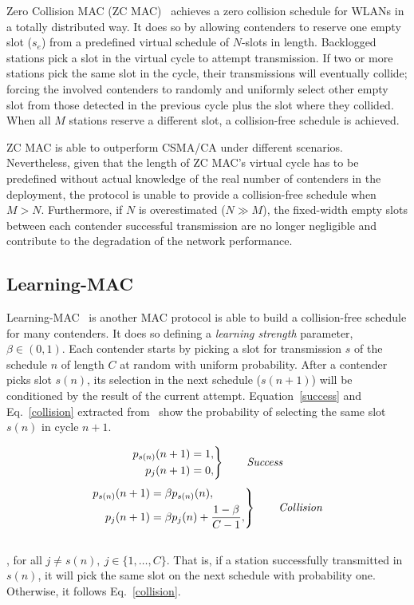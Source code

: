 \documentclass[a4paper,journal]{IEEEtran}
\begin{document}
Zero Collision MAC (ZC MAC)~\cite{ZMAC} achieves a zero collision schedule for WLANs in a totally distributed way. It does so by allowing contenders to reserve one empty slot ($s_{e}$) from a  predefined virtual schedule of $N$-slots in length. Backlogged stations pick a slot in the virtual cycle to attempt transmission. If two or more stations pick the same slot in the cycle, their transmissions will eventually collide; forcing the involved contenders to randomly and uniformly select other empty slot from those detected in the previous cycle plus the slot where they collided. When all $M$ stations reserve a different slot, a collision-free schedule is achieved.

ZC MAC is able to outperform CSMA/CA under different scenarios. Nevertheless, given that the length of ZC MAC's virtual cycle has to be predefined without actual knowledge of the real number of contenders in the deployment, the protocol is unable to provide a collision-free schedule when $M>N$. Furthermore, if $N$ is overestimated ($N\gg M$), the fixed-width empty slots between each contender successful transmission are no longer negligible and contribute to the degradation of the network performance.


\subsection{Learning-MAC}

Learning-MAC~\cite{L_MAC} is another MAC protocol is able to build a collision-free schedule for many contenders. It does so defining a \emph{learning strength} parameter, $\beta\in(0,1)$. Each contender starts by picking a slot for transmission $s$ of the schedule $n$ of length $C$ at random with uniform probability. After a contender picks slot $s(n)$, its selection in the next schedule ($s(n+1)$) will be conditioned by the result of the current attempt. Equation~\ref{success} and Eq.~\ref{collision} extracted from~\cite{L_MAC} show the probability of selecting the same slot $s(n)$ in cycle $n+1$.

\begin{equation} \label{success}
		\left. \begin{aligned}
			p_{s(n)}(n+1)&=1,\\
			p_{j}(n+1)&=0,
		\end{aligned}
	\right\}
	\qquad \text{\emph{Success}}
\end{equation}
\begin{equation} \label{collision}
	\left. \begin{aligned}
			p_{s(n)}(n+1)&=\beta p_{s(n)}(n),\\
			p_{j}(n+1)&=\beta p_{j}(n)+\frac{1-\beta}{C -1},
		\end{aligned}
	\right\}
	\qquad \text{\emph{Collision}}
\end{equation}
\\
, for all $j\neq s(n),~j\in \{1,\dots ,C\}$. That is, if a station successfully transmitted in $s(n)$, it will pick the same slot on the next schedule with probability one. Otherwise, it follows Eq.~\ref{collision}.
\end{document}
